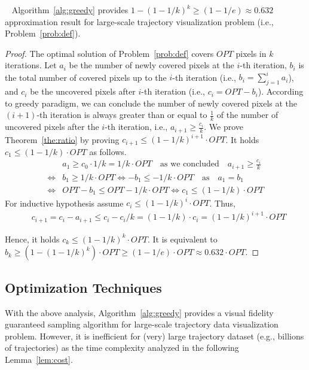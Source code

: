 \begin{theorem}~\label{the:ratio}
Algorithm~\ref{alg:greedy} provides $1-(1-1/k)^k \geq (1-1/e) \approx 0.632$ approximation result for large-scale trajectory visualization problem (i.e., Problem~\ref{prob:def}).
\end{theorem}

\begin{proof}
The optimal solution of Problem~\ref{prob:def} covers $OPT$ pixels in $k$ iterations.
Let $a_i$ be the number of newly covered pixels at the $i$-th iteration, $b_i$ is the total number of covered pixels up to the $i$-th iteration (i.e., $b_i = \sum_{j=1}^{i}a_i$),
and $c_i$ be the uncovered pixels after $i$-th iteration (i.e., $c_i = OPT-b_i$).
According to greedy paradigm, we can conclude the number of newly covered pixels at the $(i+1)$-th iteration is always greater than or equal to $\frac{1}{k}$ of the number of uncovered pixels after the $i$-th iteration, i.e., $a_{i+1} \geq \frac{c_i}{k}$.
We prove Theorem~\ref{the:ratio} by proving $c_{i+1} \leq (1-1/k)^{i+1} \cdot OPT$.
It holds $c_1 \leq (1-1/k) \cdot OPT$ as follows.
\begin{align} \nonumber
& a_1 \geq c_0 \cdot 1/k = 1/k \cdot OPT \text{~~~as we concluded~~~} a_{i+1} \geq \frac{c_i}{k}\\ \nonumber
 \Leftrightarrow  & b_1 \geq 1/k \cdot OPT  \Leftrightarrow  -b_1 \leq - 1/k \cdot OPT  \text{~~~as~~~} a_1 = b_1\\ \nonumber
 \Leftrightarrow & OPT - b_ 1 \leq OPT - 1/k \cdot OPT  \Leftrightarrow  c_1 \leq (1-1/k) \cdot OPT
\end{align}
For inductive hypothesis assume $c_{i} \leq (1-1/k)^i \cdot OPT$. Thus,
\begin{align} \nonumber
& c_{i+1} = c_i - a_{i+1} \leq c_i - c_i/k = (1-1/k) \cdot c_i = (1-1/k)^{i+1} \cdot OPT
\end{align}

Hence, it holds $c_k \leq (1-1/k)^{k} \cdot OPT$.
It is equivalent to $b_k \geq (1 - (1-1/k)^{k}) \cdot OPT \geq (1-1/e) \cdot OPT \approx 0.632 \cdot OPT$.
\end{proof}


\subsection{Optimization Techniques}\label{sec:opt}
With the above analysis, Algorithm~\ref{alg:greedy} provides a visual fidelity guaranteed sampling algorithm for large-scale trajectory data visualization problem.
However, it is inefficient for (very) large trajectory dataset (e.g., billions of trajectories) as the time complexity analyzed in the following Lemma~\ref{lem:cost}.

